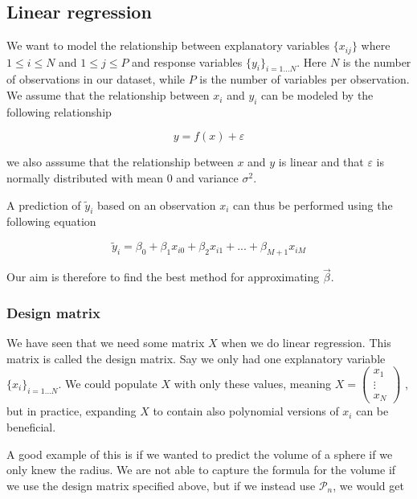\documentclass[12pt]{article}
\newcommand{\bbeta}{\vec{\beta}}
\begin{document}
\subsection{Linear regression}

We want to model the relationship between explanatory variables $\{x_{ij}\}$ where $1\leq i \leq N$ and $1 \leq j \leq P$ and response variables $\{y_i\}_{i=1...N}$.
Here $N$ is the number of observations in our dataset, while $P$ is the number of variables per observation.
We assume that the relationship between $x_i$ and $y_i$ can be modeled by the following relationship

\begin{equation}
    y = f(x) + \varepsilon
\end{equation}

we also asssume that the relationship between $x$ and $y$ is linear and that $\varepsilon$ is normally distributed with mean 0 and variance $\sigma^2$.

A prediction of $\tilde{y}_i$ based on an observation $x_i$ can thus be performed using the following equation

\begin{equation}
    \tilde{y}_i = \beta_0 + \beta_1 x_{i0} + \beta_2 x_{i1} + ... + \beta_{M+1} x_{iM}
\end{equation}

Our aim is therefore to find the best method for approximating $\bbeta$.


\subsubsection{Design matrix}

We have seen that we need some matrix $X$ when we do linear regression.
This matrix is called the design matrix. Say we only had one explanatory variable $\{x_i\}_{i=1...N}$.
We could populate $X$ with only these values, meaning
$X=\begin{pmatrix}
    x_1 \\
    \vdots \\
    x_N
\end{pmatrix}$
, but in practice, expanding $X$ to contain also polynomial versions of $x_i$ can be beneficial.

A good example of this is if we wanted to predict the volume of a sphere if we only knew the radius.
We are not able to capture the formula for the volume if we use the design matrix specified above,
but if we instead use $\mathcal{P}_n$, we would get
\end{document}
